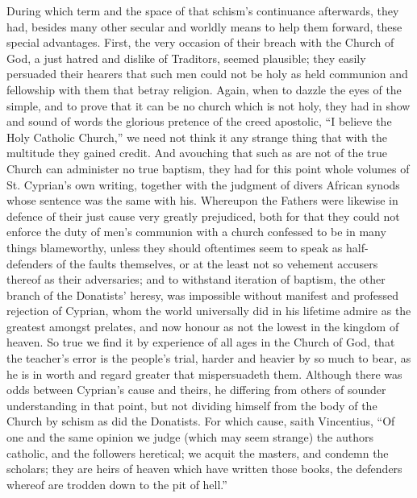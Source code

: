 During which term and the space of that schism’s continuance afterwards, they had, besides many other secular and worldly means to help them forward, these special advantages. First, the very occasion of their breach with the Church of God, a just hatred and dislike of Traditors, seemed plausible; they easily persuaded their hearers that such men could not be holy as held communion and fellowship with them that betray religion. Again, when to dazzle the eyes of the simple, and to prove that it can be no church which is not holy, they had in show and sound of words the glorious pretence of the creed apostolic, “I believe the Holy Catholic Church,” we need not think it any strange thing that with the multitude they gained credit. And avouching that such as are not of the true Church can administer no true baptism, they had for this point whole volumes of St.  Cyprian’s own writing, together with the judgment of divers African synods whose sentence was the same with his.
 Whereupon the Fathers were likewise in defence of their just cause very greatly prejudiced, both for that they could not enforce the duty of men’s communion with a church confessed to be in many things blameworthy, unless they should oftentimes seem to speak as half-defenders of the faults themselves, or at the least not so vehement accusers thereof as their adversaries; and to withstand iteration of baptism, the other branch of the Donatists’ heresy, was impossible without manifest and professed rejection of Cyprian, whom the world universally did in his lifetime admire as the greatest amongst prelates, and now honour as not the lowest in the kingdom of heaven. So true we find it by experience of all ages in the Church of God, that the teacher’s error is the people’s trial, harder and heavier by so much to bear, as he is in worth and regard greater that mispersuadeth them. Although there was odds between Cyprian’s cause and theirs, he differing from others of sounder understanding in that point, but not dividing himself from the body of the Church by schism as did the Donatists. For which cause, saith Vincentius, “Of one and the same opinion we judge (which may seem strange) the authors catholic, and the followers heretical; we acquit the masters, and condemn the scholars; they are heirs of heaven which have written those books, the defenders whereof are trodden down to the pit of hell.”

